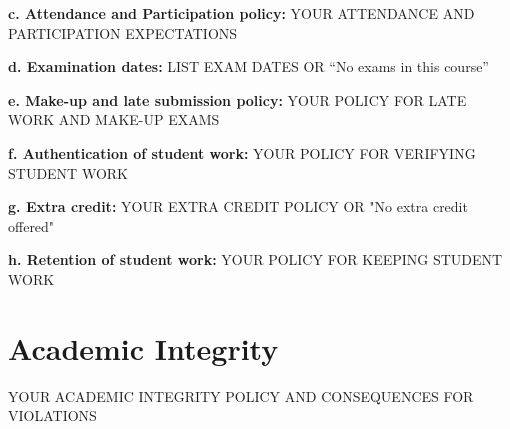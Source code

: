 \documentclass[12pt]{article}
\begin{document}
\vspace{1em}
\noindent \textbf{c. Attendance and Participation policy:}
YOUR ATTENDANCE AND PARTICIPATION EXPECTATIONS

\vspace{1em}
\noindent \textbf{d. Examination dates:}
LIST EXAM DATES OR ``No exams in this course''

\vspace{1em}
\noindent \textbf{e. Make-up and late submission policy:}
YOUR POLICY FOR LATE WORK AND MAKE-UP EXAMS

\vspace{1em}
\noindent \textbf{f. Authentication of student work:}
YOUR POLICY FOR VERIFYING STUDENT WORK

\vspace{1em}
\noindent \textbf{g. Extra credit:}
YOUR EXTRA CREDIT POLICY OR "No extra credit offered"

\vspace{1em}
\noindent \textbf{h. Retention of student work:}
YOUR POLICY FOR KEEPING STUDENT WORK


\section*{Academic Integrity}
YOUR ACADEMIC INTEGRITY POLICY AND CONSEQUENCES FOR VIOLATIONS

\end{document}
